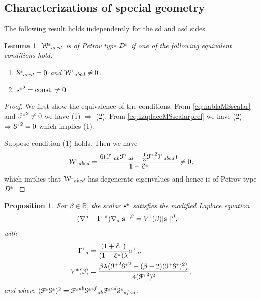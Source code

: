\documentclass[a4paper,11pt,reqno]{amsart}
\newcommand{\Reals}{\mathbb{R}}
\newcommand{\Scal}{\mathop{\rm Scal}}
\theoremstyle{plain}
\newtheorem{lemma}[thm]{Lemma}
\newtheorem{prop}[thm]{Proposition}
\newcommand{\PM}[1]{{{#1}^{\hspace{-.5pt}\scaleto{\pm}{3.5pt}}}}
\newcommand{\MP}[1]{{{#1}^{\hspace{-.5pt}\scaleto{\mp}{3.5pt}}}}
\def\Wcal{\mathcal{W}}
\def\Fcal{\mathcal{F}}
\def\Ecal{\mathcal{E}}
\def\Scal{\mathcal{S}}
\def\Ical{\mathcal{I}}
\def\sbold{\mathbf{s}}
\numberwithin{equation}{section}
\begin{document}
\subsection{Characterizations of special geometry} 
The following result holds independently for the sd and asd sides. 
\begin{lemma}
$\PM{\Wcal}_{abcd} $ is of Petrov type $\PM{D}$ if one of the following equivalent conditions hold.
\begin{enumerate}
\item $\PM{\Scal}_{abcd} = 0$ and $\PM{\Wcal}_{abcd} \neq 0$.
\item $\PM{\sbold}^2 = \text{const.} \neq 0$.
\end{enumerate}
\end{lemma}
\begin{proof}
We first show the equivalence of the conditions. From \eqref{eq:nablaMSscalar} and $\PM{\Fcal}^2 \neq0$ we have (1) $\Rightarrow$ (2). From \eqref{eq:LaplaceMSscalarprel} we have (2) $\Rightarrow \PM{\Scal}^2 = 0$ which implies (1).

Suppose condition (1) holds. Then we have
\begin{align}
\PM{\Wcal}_{abcd} = \frac{6 (\PM{\Fcal}_{ab} \PM{\Fcal}_{cd} -  \tfrac{1}{3} \PM{\Fcal}^2 \PM{\Ical}_{abcd})}{1 -  \PM{\Ecal}} \neq 0, 
\end{align}
which implies that $\PM{\Wcal}_{abcd}$ has degenerate eigenvalues and hence is of Petrov type $\PM{D}$.
\end{proof}

%

\begin{prop} \label{prop:MS} 
For  $\beta \in \Reals$, the scalar $\PM{\sbold}$ satisfies the modified Laplace equation
\begin{align} \label{eq:LaplaceMSscalar}
(\nabla^{a} - \PM{\Gamma}^{a}) \nabla_{a} |\PM{\sbold}|^\beta ={}& \PM{V}(\beta) |\PM{\sbold}|^\beta,
\end{align}
with  
\begin{align}
\PM{\Gamma}_{a}={}&\frac{(1 + \MP{\Ecal}) }{(1 -  \PM{\Ecal}) \lambda} \PM{\sigma}_{a}, \label{eq:Gammapm}\\
\PM{V}(\beta) ={}& \frac{\beta \lambda \bigl(\PM{\Fcal}^2 \PM{\Scal}^2 + (\beta - 2) (\PM{\Fcal}\PM{\Scal})^2 \bigr) }{4 (\PM{\Fcal}^2)^2}, \label{eq:Vpm}
\end{align}
and where $(\PM{\Fcal}\PM{\Scal})^2 = \PM{\Fcal}^{ab} \PM{\Scal}^{ef}{}_{ab} \PM{\Fcal}^{cd} \PM{\Scal}_{efcd} $.
\end{prop}
\end{document}
